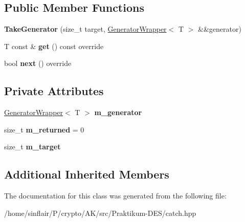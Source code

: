 \subsection*{Public Member Functions}
\begin{DoxyCompactItemize}
\item 
\mbox{\label{classCatch_1_1Generators_1_1TakeGenerator_aacef789c01a86246249c88a184268c65}} 
{\bfseries Take\+Generator} (size\+\_\+t target, \hyperlink{classCatch_1_1Generators_1_1GeneratorWrapper}{Generator\+Wrapper}$<$ T $>$ \&\&generator)
\item 
\mbox{\label{classCatch_1_1Generators_1_1TakeGenerator_aa4d2560f2066ec2eb4a351d62c107c78}} 
T const  \& {\bfseries get} () const override
\item 
\mbox{\label{classCatch_1_1Generators_1_1TakeGenerator_ae343f3e28fe04e0a20d6fdf69bfb4c78}} 
bool {\bfseries next} () override
\end{DoxyCompactItemize}
\subsection*{Private Attributes}
\begin{DoxyCompactItemize}
\item 
\mbox{\label{classCatch_1_1Generators_1_1TakeGenerator_a2193ff62cd0fe809049b6d6b2f399d89}} 
\hyperlink{classCatch_1_1Generators_1_1GeneratorWrapper}{Generator\+Wrapper}$<$ T $>$ {\bfseries m\+\_\+generator}
\item 
\mbox{\label{classCatch_1_1Generators_1_1TakeGenerator_a1014eb709685999a1b6aeed05b4dd978}} 
size\+\_\+t {\bfseries m\+\_\+returned} = 0
\item 
\mbox{\label{classCatch_1_1Generators_1_1TakeGenerator_a8ad16c4baed05b024a86a9c87c9cd0a7}} 
size\+\_\+t {\bfseries m\+\_\+target}
\end{DoxyCompactItemize}
\subsection*{Additional Inherited Members}


The documentation for this class was generated from the following file\+:\begin{DoxyCompactItemize}
\item 
/home/sinflair/\+P/crypto/\+A\+K/src/\+Praktikum-\/\+D\+E\+S/catch.\+hpp\end{DoxyCompactItemize}
